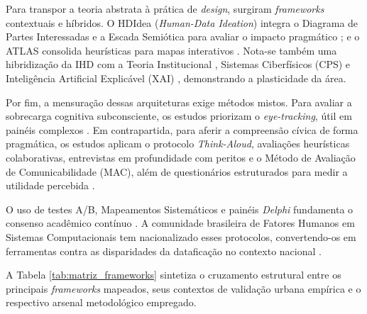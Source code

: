 \documentclass[12pt]{article}
\begin{document}
    Para transpor a teoria abstrata à prática de \textit{design}, surgiram \textit{frameworks} contextuais e híbridos. O HDIdea (\textit{Human-Data Ideation}) integra o Diagrama de Partes Interessadas e a Escada Semiótica para avaliar o impacto pragmático \cite{Strey2019Human}; e o ATLAS consolida heurísticas para mapas interativos \cite{Capeleti2024Human}. Nota-se também uma hibridização da IHD com a Teoria Institucional \cite{mu2024institutional}, Sistemas Ciberfísicos (CPS) \cite{bavaresco2019technological, Zou2020769} e Inteligência Artificial Explicável (XAI) \cite{Yuan20243615, Turkay2021, durango2024data}, demonstrando a plasticidade da área.

    Por fim, a mensuração dessas arquiteturas exige métodos mistos. Para avaliar a sobrecarga cognitiva subconsciente, os estudos priorizam o \textit{eye-tracking}, útil em painéis complexos \cite{Capeleti2024Human, kaufmann2021ethical}. Em contrapartida, para aferir a compreensão cívica de forma pragmática, os estudos aplicam o protocolo \textit{Think-Aloud}, avaliações heurísticas colaborativas, entrevistas em profundidade com peritos e o Método de Avaliação de Comunicabilidade (MAC), além de questionários estruturados para medir a utilidade percebida \cite{Strey2019Human, Belizario2023Interacao, Capeleti2024Human}. 

    O uso de testes A/B, Mapeamentos Sistemáticos e painéis \textit{Delphi} fundamenta o consenso acadêmico contínuo \cite{calvetti2024human, hayes2024making, Refat2023}. A comunidade brasileira de Fatores Humanos em Sistemas Computacionais tem nacionalizado esses protocolos, convertendo-os em ferramentas contra as disparidades da dataficação no contexto nacional \cite{Capeleti2024Human, Strey2019Human, Belizario2023Interacao}.

    A Tabela \ref{tab:matriz_frameworks} sintetiza o cruzamento estrutural entre os principais \textit{frameworks} mapeados, seus contextos de validação urbana empírica e o respectivo arsenal metodológico empregado.
\end{document}
